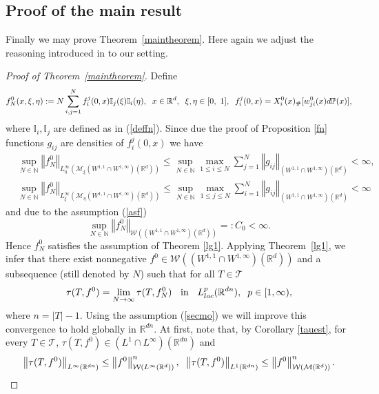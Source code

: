 \documentclass[10pt]{article}
\newcommand{\eqq}[2]{\begin{equation}  #1  \label{#2}\end{equation}    }
\newcommand{\hd}{\hspace{0.2cm}}
\newcommand{\m}[1]{\mbox{#1}}
\newcommand*{\norm}[1]{\left\Vert{#1}\right\Vert}
\newcommand{\R}{\mathbb{R}}
\newcommand{\Tree}{\mathcal{T}}
\newcommand{\wji}{w_{ji}}
\newcommand{\fji}{f^j_i}
\newcommand{\W}{\mathcal{W}}
\newcommand{\mI}{\mathbb{I}}
\begin{document}
\subsection{Proof of the main result}
Finally we may prove  Theorem~\ref{maintheorem}. Here again we adjust the reasoning introduced in \cite{JPS2025} to our setting. 
\begin{proof}[Proof of Theorem~\ref{maintheorem}]
Define
\[
f_N^0(x,\xi,\eta):=N\sum_{i,j=1}^N \fji(0,x)\mI_j(\xi) \mI_i(\eta), \hd  x\in \R^d,\hd \xi,\eta \in [0,\ 1], \hd \fji(0,x) = X_i^0(x)_{\#}[\wji^0(x)d\mathbb{P}(x)],
\]
where $\mI_i,\mI_j$ are defined as in (\ref{deffn}). Since due the proof of Proposition \ref{fn} functions $g_{ij}$ are densities of $\fji(0,x)$ we have
\begin{align*}
 &\sup_{N\in \mathbb{N}}\norm{f^0_N}_{L^{\infty}_\eta(\mathcal{M}_\xi (W^{1,1}\cap W^{1,\infty})(\R^d))} \leq \sup_{N\in \mathbb{N}}\max_{1\leq i \leq N}\sum_{j=1}^N\norm{g_{ij}}_{(W^{1,1}\cap W^{1,\infty})(\R^d)} < \infty,\\ 
 &\sup_{N\in \mathbb{N}}\norm{f^0_N}_{L^{\infty}_\xi(\mathcal{M}_\eta (W^{1,1}\cap W^{1,\infty})(\R^d))} \leq \sup_{N\in \mathbb{N}}\max_{1\leq j \leq N}\sum_{i=1}^N\norm{g_{ij}}_{(W^{1,1}\cap W^{1,\infty})(\R^d)} < \infty
\end{align*}
and due to the assumption (\ref{asf}) 
\eqq{
\sup_{N \in \mathbb{N}}\norm{f^0_N}_{\W((W^{1,1}\cap W^{1,\infty})(\R^d))}=:C_0 < \infty.
}{ufnb}
Hence $f^0_N$ satisfies the assumption of Theorem \ref{lg1}.
Applying Theorem~\ref{lg1}, we infer that there exist nonnegative $f^0\in \W( (W^{1,1}\cap W^{1,\infty})(\R^d))$ and a subsequence (still denoted by $N$) such that for all $T \in \Tree$
\[
\tau(T,f^0)=\lim_{N \to \infty} \tau(T,f_N^0) \hd \m{ in } \hd L^p_{loc}(\R^{dn}), \hd p \in [1,\infty),
\]
where $n=|T|-1$. Using the assumption (\ref{secmo}) we will improve this convergence to hold globally in $\R^{dn}$.
At first, note that,  by Corollary \ref{tauest}, for every $T \in \Tree$, $\tau(T,f^0) \in (L^{1}\cap L^{\infty})(\R^{dn})$ and
\[
\norm{\tau(T,f^0)}_{L^\infty(\R^{dn})} \leq \norm{f^0}_{\W(L^\infty(\R^d))}^{n} , \hd 
\norm{\tau(T,f^0)}_{L^1(\R^{dn})} \leq \norm{f^0}_{\W(\mathcal{M}(\R^d))}^{n}.
\]



\end{proof}
\end{document}
